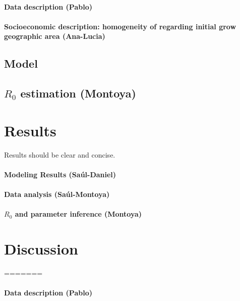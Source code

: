 \documentclass[draft, openbib]{imammb}
\numberwithin{equation}{section}
\begin{document}
            \paragraph{Data description (Pablo)}
            \paragraph{Socioeconomic description: 
                homogeneity of regarding initial
                grow geographic area (Ana-Lucia)}
        \subsection*{Model}
            
            
            
        \subsection{$R_0$ estimation (Montoya)}
    \section{Results}
        Results should be clear and concise.
        \paragraph{Modeling Results (Saúl-Daniel)}
        \paragraph{Data analysis (Saúl-Montoya)}
        \paragraph{$R_0$ and parameter inference (Montoya)}

    \section{Discussion}
=======
            \label{sec:Intro}
            \paragraph{Data description (Pablo)}
\end{document}
